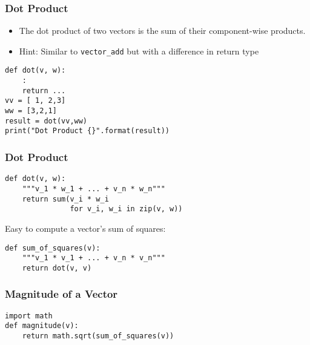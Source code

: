 \begin{frame}[fragile]\frametitle{Dot Product}
\begin{itemize}
\item  The dot product of two vectors is the sum of their component-wise products. 
\item Hint: Similar to \lstinline|vector_add| but with a difference in return type
\end{itemize}
\begin{lstlisting}
def dot(v, w):
	:
	return ...
vv = [ 1, 2,3]
ww = [3,2,1]
result = dot(vv,ww)
print("Dot Product {}".format(result))
\end{lstlisting}
\end{frame}

\begin{frame}[fragile]\frametitle{Dot Product}
\begin{lstlisting}
def dot(v, w):
    """v_1 * w_1 + ... + v_n * w_n"""
    return sum(v_i * w_i
               for v_i, w_i in zip(v, w))
\end{lstlisting}


Easy to compute a vector's sum of squares:
\begin{lstlisting}
def sum_of_squares(v):
    """v_1 * v_1 + ... + v_n * v_n"""
    return dot(v, v)
\end{lstlisting}
\end{frame}


\begin{frame}[fragile]\frametitle{Magnitude of a Vector}
\begin{lstlisting}
import math
def magnitude(v):
    return math.sqrt(sum_of_squares(v)) 
\end{lstlisting}
\end{frame}

